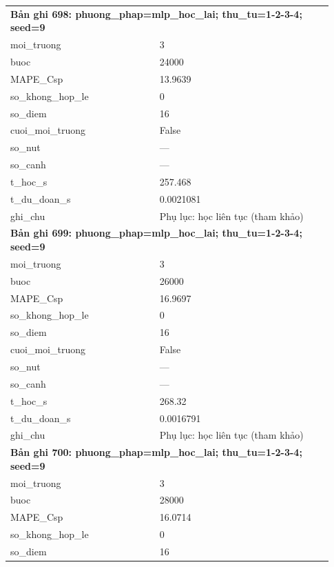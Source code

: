 \begin{longtable}{p{0.43\linewidth}p{0.50\linewidth}}
\midrule
\multicolumn{2}{p{0.95\linewidth}}{\textbf{Bản ghi 698: phuong\_phap=mlp\_hoc\_lai; thu\_tu=1-2-3-4; seed=9}} \\
moi\_\allowbreak truong & 3 \\
buoc & 24000 \\
MAPE\_\allowbreak Csp & 13.9639 \\
so\_\allowbreak khong\_\allowbreak hop\_\allowbreak le & 0 \\
so\_\allowbreak diem & 16 \\
cuoi\_\allowbreak moi\_\allowbreak truong & False \\
so\_\allowbreak nut & — \\
so\_\allowbreak canh & — \\
t\_\allowbreak hoc\_\allowbreak s & 257.468 \\
t\_\allowbreak du\_\allowbreak doan\_\allowbreak s & 0.0021081 \\
ghi\_\allowbreak chu & Phụ lục: học liên tục (tham khảo) \\
\midrule
\multicolumn{2}{p{0.95\linewidth}}{\textbf{Bản ghi 699: phuong\_phap=mlp\_hoc\_lai; thu\_tu=1-2-3-4; seed=9}} \\
moi\_\allowbreak truong & 3 \\
buoc & 26000 \\
MAPE\_\allowbreak Csp & 16.9697 \\
so\_\allowbreak khong\_\allowbreak hop\_\allowbreak le & 0 \\
so\_\allowbreak diem & 16 \\
cuoi\_\allowbreak moi\_\allowbreak truong & False \\
so\_\allowbreak nut & — \\
so\_\allowbreak canh & — \\
t\_\allowbreak hoc\_\allowbreak s & 268.32 \\
t\_\allowbreak du\_\allowbreak doan\_\allowbreak s & 0.0016791 \\
ghi\_\allowbreak chu & Phụ lục: học liên tục (tham khảo) \\
\midrule
\multicolumn{2}{p{0.95\linewidth}}{\textbf{Bản ghi 700: phuong\_phap=mlp\_hoc\_lai; thu\_tu=1-2-3-4; seed=9}} \\
moi\_\allowbreak truong & 3 \\
buoc & 28000 \\
MAPE\_\allowbreak Csp & 16.0714 \\
so\_\allowbreak khong\_\allowbreak hop\_\allowbreak le & 0 \\
so\_\allowbreak diem & 16 \\

\end{longtable}
